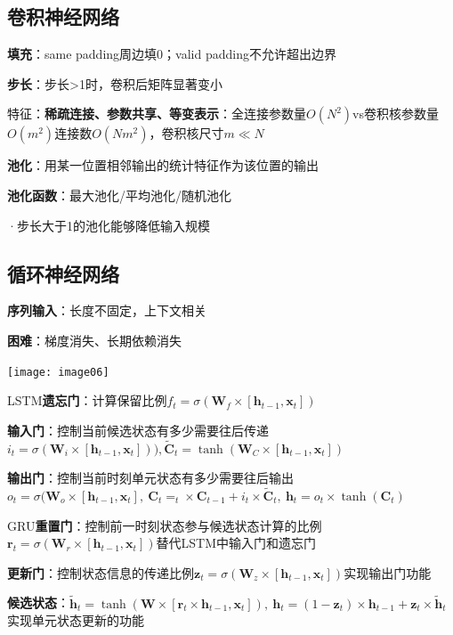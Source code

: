 	\subsection*{卷积神经网络}
	
	\textbf{填充}：same padding周边填0；valid padding不允许超出边界
	
	\textbf{步长}：步长>1时，卷积后矩阵显著变小
	
	特征：\textbf{稀疏连接、参数共享、等变表示}：全连接参数量$O(N^2)$vs卷积核参数量$O(m^2)$连接数$O(Nm^2)$，卷积核尺寸$m\ll N$
	
	\textbf{池化}：用某一位置相邻输出的统计特征作为该位置的输出
	
	\textbf{池化函数}：最大池化/平均池化/随机池化
	
	·步长大于1的池化能够降低输入规模
	
	\subsection*{循环神经网络}
	
	\textbf{序列输入}：长度不固定，上下文相关
	
	\textbf{困难}：梯度消失、长期依赖消失
	
	\begin{figurehere}
		\centering
		\texttt{[image: image06]}
		\label{fig:image06}
	\end{figurehere}
	
	LSTM\textbf{遗忘门}：计算保留比例$f_t=\sigma(\mathbf{W}_f\times[\mathbf{h}_{t-1},\mathbf{x}_t])$
	
	\textbf{输入门}：控制当前候选状态有多少需要往后传递$i_t=\sigma(\mathbf{W}_i\times[\mathbf{h}_{t-1},\mathbf{x}_t])), \tilde{\mathbf{C}}_t = \tanh(\mathbf{W}_C \times [\mathbf{h}_{t-1}, \mathbf{x}_t])$
	
	\textbf{输出门}：控制当前时刻单元状态有多少需要往后输出$o_t = \sigma(\mathbf{W}_o \times [\mathbf{h}_{t-1}, \mathbf{x}_t],~ \mathbf{C}_t = _t \times \mathbf{C}_{t-1} + i_t \times \tilde{\mathbf{C}}_t,~ \mathbf{h}_t = o_t \times \tanh(\mathbf{C}_t)$
	
	GRU\textbf{重置门}：控制前一时刻状态参与候选状态计算的比例$\mathbf{r}_t = \sigma(\mathbf{W}_r \times [\mathbf{h}_{t-1}, \mathbf{x}_t])$替代LSTM中输入门和遗忘门
	
	\textbf{更新门}：控制状态信息的传递比例$\mathbf{z}_t = \sigma(\mathbf{W}_z \times [\mathbf{h}_{t-1}, \mathbf{x}_t])$实现输出门功能
	
	\textbf{候选状态}：$\tilde{\mathbf{h}}_t = \tanh(\mathbf{W} \times [\mathbf{r}_t \times \mathbf{h}_{t-1}, \mathbf{x}_t]),~\mathbf{h}_t = (1 - \mathbf{z}_t) \times \mathbf{h}_{t-1} + \mathbf{z}_t \times \tilde{\mathbf{h}}_t$实现单元状态更新的功能
	

